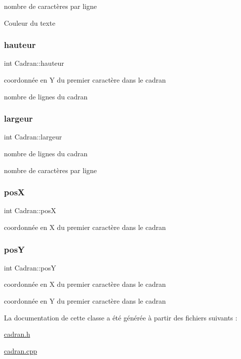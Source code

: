 nombre de caractères par ligne 

Couleur du texte \mbox{\label{class_cadran_a18a3e6147ef0d98e8f556b7a590c753e}} 
\subsubsection{\texorpdfstring{hauteur}{hauteur}}
{\footnotesize\ttfamily int Cadran\+::hauteur\hspace{0.3cm}{\ttfamily [private]}}



coordonnée en Y du premier caractère dans le cadran 

nombre de lignes du cadran \mbox{\label{class_cadran_a6c930bf327a38424afe4cb0ce75c0650}} 
\subsubsection{\texorpdfstring{largeur}{largeur}}
{\footnotesize\ttfamily int Cadran\+::largeur\hspace{0.3cm}{\ttfamily [private]}}



nombre de lignes du cadran 

nombre de caractères par ligne \mbox{\label{class_cadran_a4b753893bf4f7bb4b61018544ddb2450}} 
\subsubsection{\texorpdfstring{posX}{posX}}
{\footnotesize\ttfamily int Cadran\+::posX\hspace{0.3cm}{\ttfamily [private]}}

coordonnée en X du premier caractère dans le cadran \mbox{\label{class_cadran_a9fe9e082e2421e00d044598765adcdeb}} 
\subsubsection{\texorpdfstring{posY}{posY}}
{\footnotesize\ttfamily int Cadran\+::posY\hspace{0.3cm}{\ttfamily [private]}}



coordonnée en X du premier caractère dans le cadran 

coordonnée en Y du premier caractère dans le cadran 

La documentation de cette classe a été générée à partir des fichiers suivants \+:\begin{DoxyCompactItemize}
\item 
\hyperlink{cadran_8h}{cadran.\+h}\item 
\hyperlink{cadran_8cpp}{cadran.\+cpp}\end{DoxyCompactItemize}
